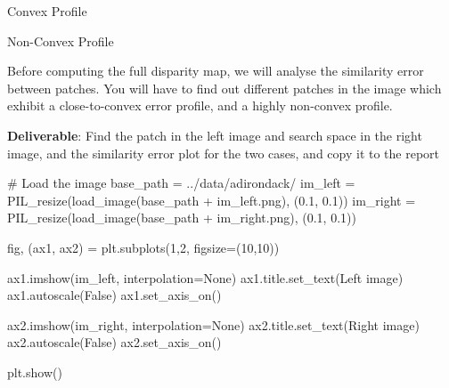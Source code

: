 \documentclass[
  letterpaper,
  DIV=11,
  numbers=noendperiod]{scrartcl}
\newenvironment{Shaded}{\begin{snugshade}}{\end{snugshade}}
\newcommand{\CommentTok}[1]{\textcolor[rgb]{0.37,0.37,0.37}{#1}}
\newcommand{\DecValTok}[1]{\textcolor[rgb]{0.68,0.00,0.00}{#1}}
\newcommand{\FloatTok}[1]{\textcolor[rgb]{0.68,0.00,0.00}{#1}}
\newcommand{\NormalTok}[1]{\textcolor[rgb]{0.00,0.23,0.31}{#1}}
\newcommand{\OperatorTok}[1]{\textcolor[rgb]{0.37,0.37,0.37}{#1}}
\newcommand{\StringTok}[1]{\textcolor[rgb]{0.13,0.47,0.30}{#1}}
\newcommand{\VariableTok}[1]{\textcolor[rgb]{0.07,0.07,0.07}{#1}}
\begin{document}
Convex Profile

Non-Convex Profile

Before computing the full disparity map, we will analyse the similarity
error between patches. You will have to find out different patches in
the image which exhibit a close-to-convex error profile, and a highly
non-convex profile.

\textbf{Deliverable}: Find the patch in the left image and search space
in the right image, and the similarity error plot for the two cases, and
copy it to the report

\begin{Shaded}
\begin{Highlighting}[]
\CommentTok{\# Load the image}
\NormalTok{base\_path }\OperatorTok{=} \StringTok{\textquotesingle{}../data/adirondack/\textquotesingle{}}
\NormalTok{im\_left }\OperatorTok{=}\NormalTok{ PIL\_resize(load\_image(base\_path }\OperatorTok{+} \StringTok{\textquotesingle{}im\_left.png\textquotesingle{}}\NormalTok{), (}\FloatTok{0.1}\NormalTok{, }\FloatTok{0.1}\NormalTok{))}
\NormalTok{im\_right }\OperatorTok{=}\NormalTok{ PIL\_resize(load\_image(base\_path }\OperatorTok{+} \StringTok{\textquotesingle{}im\_right.png\textquotesingle{}}\NormalTok{), (}\FloatTok{0.1}\NormalTok{, }\FloatTok{0.1}\NormalTok{))}
\end{Highlighting}
\end{Shaded}

\begin{Shaded}
\begin{Highlighting}[]
\NormalTok{fig, (ax1, ax2) }\OperatorTok{=}\NormalTok{ plt.subplots(}\DecValTok{1}\NormalTok{,}\DecValTok{2}\NormalTok{, figsize}\OperatorTok{=}\NormalTok{(}\DecValTok{10}\NormalTok{,}\DecValTok{10}\NormalTok{))}

\NormalTok{ax1.imshow(im\_left, interpolation}\OperatorTok{=}\VariableTok{None}\NormalTok{)}
\NormalTok{ax1.title.set\_text(}\StringTok{\textquotesingle{}Left image\textquotesingle{}}\NormalTok{)}
\NormalTok{ax1.autoscale(}\VariableTok{False}\NormalTok{)}
\NormalTok{ax1.set\_axis\_on()}

\NormalTok{ax2.imshow(im\_right, interpolation}\OperatorTok{=}\VariableTok{None}\NormalTok{)}
\NormalTok{ax2.title.set\_text(}\StringTok{\textquotesingle{}Right image\textquotesingle{}}\NormalTok{)}
\NormalTok{ax2.autoscale(}\VariableTok{False}\NormalTok{)}
\NormalTok{ax2.set\_axis\_on()}

\NormalTok{plt.show()}
\end{Highlighting}
\end{Shaded}
\end{document}
